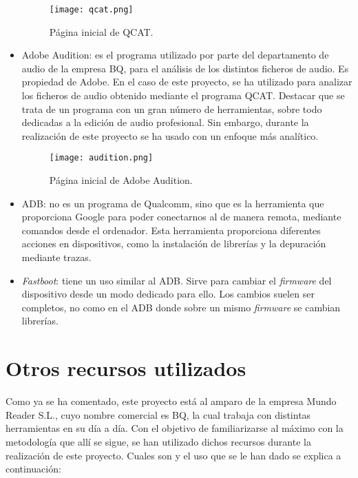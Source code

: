 \begin{itemize}
\begin{figure}[H]
		\centering
		\texttt{[image: qcat.png]}
		\caption{Página inicial de QCAT.}
		\label{fig:qcat}
	\end{figure}	
	\item{Adobe Audition: es el programa utilizado por parte del departamento de audio de la empresa BQ, para el análisis de los distintos ficheros de audio. Es propiedad de Adobe. En el caso de este proyecto, se ha utilizado para analizar los ficheros de audio obtenido mediante el programa \gls{QCAT}. Destacar que se trata de un programa con un gran número de herramientas, sobre todo dedicadas a la edición de audio profesional. Sin embargo, durante la realización de este proyecto se ha usado con un enfoque más analítico.}
	\begin{figure}[H]
		\centering
		\texttt{[image: audition.png]}
		\caption{Página inicial de Adobe Audition.}
		\label{fig:audition}
	\end{figure}	
	\item{\gls{ADB}: no es un programa de Qualcomm, sino que es la herramienta que proporciona Google para poder conectarnos al de manera remota, mediante comandos desde el ordenador. Esta herramienta proporciona diferentes acciones en dispositivos, como la instalación de librerías y la depuración mediante trazas.}
	\item{\textit{Fastboot}: tiene un uso similar al \gls{ADB}. Sirve para cambiar el \textit{firmware} del dispositivo desde un modo dedicado para ello. Los cambios suelen ser completos, no como en el \gls{ADB} donde sobre un mismo \textit{firmware} se cambian librerías.}
\end{itemize}

\section{Otros recursos utilizados} \label{sec:otros_recursos}
Como ya se ha comentado, este proyecto está al amparo de la empresa Mundo Reader S.L., cuyo nombre comercial es BQ, la cual trabaja con distintas herramientas en su día a día. Con el objetivo de familiarizarse al máximo con la metodología que allí se sigue, se han utilizado dichos recursos durante la realización de este proyecto. Cuales son y el uso que se le han dado se explica a continuación:

